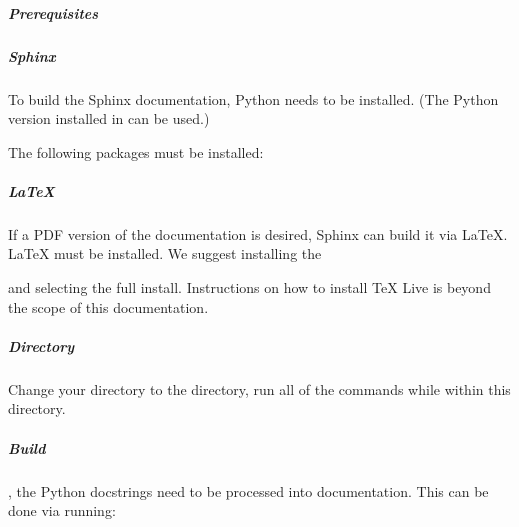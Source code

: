 \documentclass[letterpaper,11pt,english]{sphinxmanual}
\begin{document}
\subparagraph{Prerequisites}
\label{\detokenize{technical/installation/documentation:prerequisites}}

\subparagraph{Sphinx}
\label{\detokenize{technical/installation/documentation:sphinx}}
\sphinxAtStartPar
To build the Sphinx documentation, Python needs to be installed. (The Python
version installed in {\hyperref[\detokenize{technical/installation/python:technical-installation-python-part}]{}} can be used.)

\sphinxAtStartPar
The following packages must be installed:

\begin{sphinxVerbatim}[commandchars=\\\{\}]
   
\end{sphinxVerbatim}


\subparagraph{LaTeX}
\label{\detokenize{technical/installation/documentation:latex}}
\sphinxAtStartPar
If a PDF version of the documentation is desired, Sphinx can build it via
LaTeX. LaTeX must be installed. We suggest installing the
%
\begin{footnote}[29]\sphinxAtStartFootnote
{}
%
\end{footnote} and selecting the full install. Instructions on
how to install TeX Live is beyond the scope of this documentation.


\subparagraph{Directory}
\label{\detokenize{technical/installation/documentation:directory}}
\sphinxAtStartPar
Change your directory to the  directory, run all of
the commands while within this directory.


\subparagraph{Build}
\label{\detokenize{technical/installation/documentation:build}}
\sphinxAtStartPar
{}, the Python docstrings need to be processed into documentation. This
can be done via running:

\begin{sphinxVerbatim}[commandchars=\\\{\}]
     
\end{sphinxVerbatim}
\end{document}
